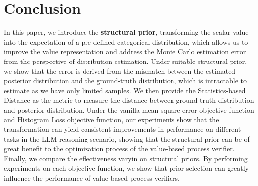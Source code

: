 \section{Conclusion}
In this paper, we introduce the \textbf{structural prior}, transforming the scalar value into the expectation of a pre-defined categorical distribution, which allows us to improve the value representation and address the Monte Carlo estimation error from the perspective of distribution estimation. Under suitable structural prior, we show that the error is derived from the mismatch between the estimated posterior distribution and the ground-truth distribution, which is intractable to estimate as we have only limited samples. We then provide the Statistics-based Distance as the metric to measure the distance between ground truth distribution and posterior distribution. Under the vanilla mean-square error objective function and Histogram Loss objective function, our experiments show that the transformation can yield consistent improvements in performance on different tasks in the LLM reasoning scenario, showing that the structural prior can be of great benefit to the optimization process of the value-based process verifier. Finally, we compare the effectiveness varyin on structural priors. By performing experiments on each objective function, we show that prior selection can greatly influence the performance of value-based process verifiers.
